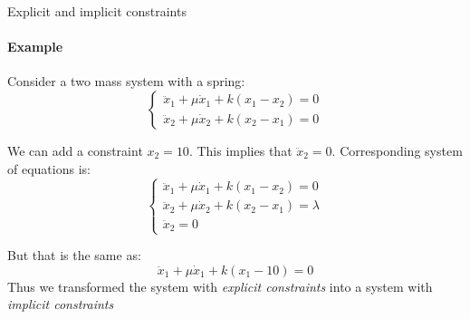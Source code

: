 \documentclass{beamer}
\begin{document}
\begin{frame}{Explicit and implicit constraints}
\framesubtitle{Example}
\begin{flushleft}

Consider a two mass system with a spring:
%
\[
\begin{cases}
\ddot x_1 + \mu \dot x_1 + k  (x_1 - x_2) = 0 \\
\ddot x_2 + \mu \dot x_2 + k  (x_2 - x_1) = 0
\end{cases}
\]

We can add a constraint $x_2 = 10$. This implies that $\ddot x_2 = 0$. Corresponding system of equations is:
%
\[
\begin{cases}
\ddot x_1 + \mu \dot x_1 + k (x_1 - x_2) = 0 \\
\ddot x_2 + \mu \dot x_2 + k (x_2 - x_1) = \lambda \\
\ddot x_2 = 0
\end{cases}
\]

But that is the same as:
\[
\ddot x_1 + \mu \dot x_1 + k  (x_1 - 10) = 0
\]
%
Thus we transformed the system with \emph{explicit constraints} into a system with \emph{implicit constraints}

\end{flushleft}
\end{frame}
\end{document}
